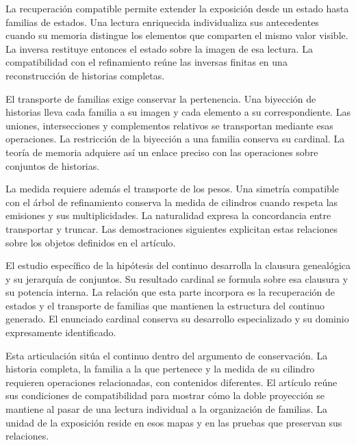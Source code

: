 
La recuperación compatible permite extender la exposición desde
un estado hasta familias de estados. Una lectura enriquecida
individualiza sus antecedentes cuando su memoria distingue los
elementos que comparten el mismo valor visible. La inversa
restituye entonces el estado sobre la imagen de esa lectura.
La compatibilidad con el refinamiento reúne las inversas finitas
en una reconstrucción de historias completas.

El transporte de familias exige conservar la pertenencia. Una
biyección de historias lleva cada familia a su imagen y cada
elemento a su correspondiente. Las uniones, intersecciones y
complementos relativos se transportan mediante esas operaciones.
La restricción de la biyección a una familia conserva su cardinal.
La teoría de memoria adquiere así un enlace preciso con las
operaciones sobre conjuntos de historias.

La medida requiere además el transporte de los pesos. Una
simetría compatible con el árbol de refinamiento conserva la
medida de cilindros cuando respeta las emisiones y sus
multiplicidades. La naturalidad expresa la concordancia entre
transportar y truncar. Las demostraciones siguientes explicitan
estas relaciones sobre los objetos definidos en el artículo.

El estudio específico de la hipótesis del continuo desarrolla
la clausura genealógica y su jerarquía de conjuntos. Su resultado
cardinal se formula sobre esa clausura y su potencia interna.
La relación que esta parte incorpora es la recuperación de
estados y el transporte de familias que mantienen la estructura
del continuo generado. El enunciado cardinal conserva su
desarrollo especializado y su dominio expresamente identificado.

Esta articulación sitúa el continuo dentro del argumento de
conservación. La historia completa, la familia a la que pertenece
y la medida de su cilindro requieren operaciones relacionadas,
con contenidos diferentes. El artículo reúne sus condiciones de
compatibilidad para mostrar cómo la doble proyección se mantiene
al pasar de una lectura individual a la organización de familias.
La unidad de la exposición reside en esos mapas y en las pruebas
que preservan sus relaciones.

